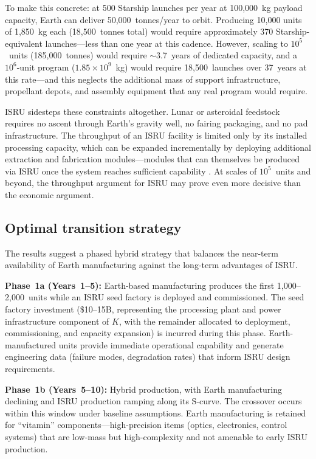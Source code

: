 \documentclass[preprint,12pt]{elsarticle}
\begin{document}
To make this concrete: at 500 Starship launches per year at 100{,}000~kg payload capacity, Earth can deliver 50{,}000~tonnes/year to orbit. Producing 10{,}000 units of 1{,}850~kg each (18{,}500~tonnes total) would require approximately 370 Starship-equivalent launches---less than one year at this cadence. However, scaling to $10^5$~units (185{,}000~tonnes) would require $\sim$3.7~years of dedicated capacity, and a $10^6$-unit program ($1.85 \times 10^9$~kg) would require 18{,}500~launches over 37~years at this rate---and this neglects the additional mass of support infrastructure, propellant depots, and assembly equipment that any real program would require.

ISRU sidesteps these constraints altogether. Lunar or asteroidal feedstock requires no ascent through Earth's gravity well, no fairing packaging, and no pad infrastructure. The throughput of an ISRU facility is limited only by its installed processing capacity, which can be expanded incrementally by deploying additional extraction and fabrication modules---modules that can themselves be produced via ISRU once the system reaches sufficient capability \cite{metzger2013}. At scales of $10^5$~units and beyond, the throughput argument for ISRU may prove even more decisive than the economic argument.

\subsection{Optimal transition strategy}

The results suggest a phased hybrid strategy that balances the near-term availability of Earth manufacturing against the long-term advantages of ISRU.

\textbf{Phase~1a (Years~1--5):} Earth-based manufacturing produces the first 1{,}000--2{,}000~units while an ISRU seed factory is deployed and commissioned. The seed factory investment (\$10--15B, representing the processing plant and power infrastructure component of $K$, with the remainder allocated to deployment, commissioning, and capacity expansion) is incurred during this phase. Earth-manufactured units provide immediate operational capability and generate engineering data (failure modes, degradation rates) that inform ISRU design requirements.

\textbf{Phase~1b (Years~5--10):} Hybrid production, with Earth manufacturing declining and ISRU production ramping along its S-curve. The crossover occurs within this window under baseline assumptions. Earth manufacturing is retained for ``vitamin'' components---high-precision items (optics, electronics, control systems) that are low-mass but high-complexity and not amenable to early ISRU production.
\end{document}
